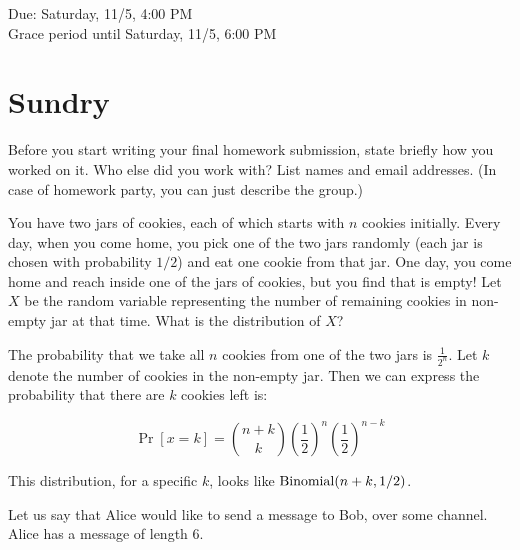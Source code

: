 \documentclass[11pt]{article}
\begin{document}
\maketitle
\fontsize{12}{15}\selectfont

\begin{center}
    Due: Saturday, 11/5, 4:00 PM \\
    Grace period until Saturday, 11/5, 6:00 PM \\
\end{center}

\section*{Sundry}
Before you start writing your final homework submission, state briefly how you worked on it.  Who else did you work with?  List names and email addresses.  (In case of homework party, you can just describe the group.)

{\color{blue}{I worked on problems 4, 5, and 6 during office hours with two other people there on Thursday and Friday. I did not work with anybody else.}}

\vspace{15pt}


You have two jars of cookies, each of which starts with $n$ cookies initially.
Every day, when you come home, you pick one of the two jars randomly (each jar is chosen with probability $1/2$) and eat one cookie from that jar.
One day, you come home and reach inside one of the jars of cookies, but you find that is empty!
Let $X$ be the random variable representing the number of remaining cookies in non-empty jar at that time.
What is the distribution of $X$?

\begin{solution}
	The probability that we take all $n$ cookies from one of the two jars is $\frac{1}{2^n}$. Let $k$ denote the number of cookies in the non-empty jar. Then we can express the probability that there are $k$ cookies left is: 

	\[ \Pr[x = k] = {n + k \choose k}\left(\frac 12\right)^n \left( \frac 12 \right)^{n - k}\]

	This distribution, for a specific $k$, looks like $\operatorname{Binomial}(n+k, 1/2)$.
\end{solution}

\pagebreak


Let us say that Alice would like to send a message to Bob, over some channel.
Alice has a message of length 6.
\end{document}
